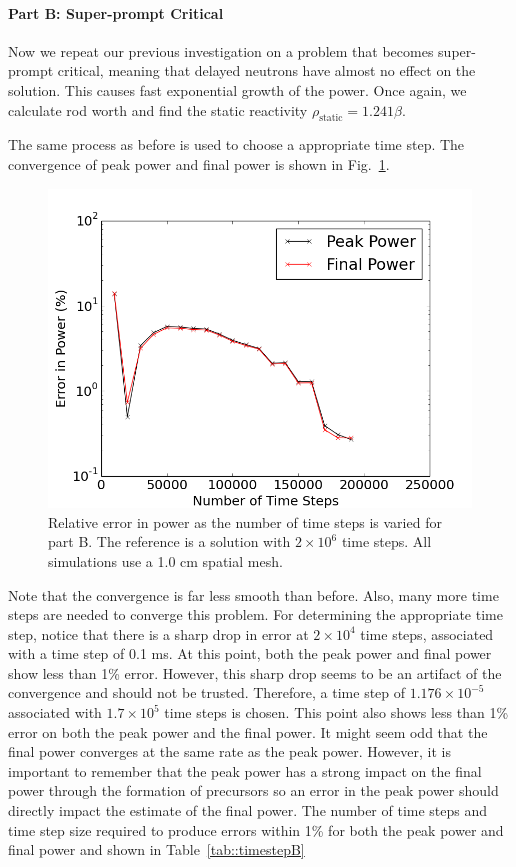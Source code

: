 \documentclass[12pt]{report}
\begin{document}
\clearpage
\paragraph{Part B: Super-prompt Critical} Now we repeat our previous investigation on a problem that becomes super-prompt critical, meaning that delayed neutrons have almost no effect on the solution. This causes fast exponential growth of the power. Once again, we calculate rod worth and find the static reactivity $\boxed{\rho_\text{static} = 1.241 \beta}$.

The same process as before is used to choose a appropriate time step. The convergence of peak power and final power is shown in Fig.~\ref{fig::partB_convergence}. 

	\begin{figure}[ht]
		\centering
		\includegraphics[width=.9\linewidth]{figs/partB_convergence.png}
		\caption{Relative error in power as the number of time steps is varied for part B. The reference is a solution with $2\times10^6$ time steps. All simulations use a 1.0 cm spatial mesh.}
		\label{fig::partB_convergence}
	\end{figure}

Note that the convergence is far less smooth than before. Also, many more time steps are needed to converge this problem. For determining the appropriate time step, notice that there is a sharp drop in error at $2 \times 10^4$ time steps, associated with a time step of 0.1 ms. At this point, both the peak power and final power show less than 1\% error. However, this sharp drop seems to be an artifact of the convergence and should not be trusted. Therefore, a time step of $1.176 \times 10^{-5}$ associated with $1.7 \times 10^5$ time steps is chosen. This point also shows less than 1\% error on both the peak power and the final power.  It might seem odd that the final power converges at the same rate as the peak power. However, it is important to remember that the peak power has a strong impact on the final power through the formation of precursors so an error in the peak power should directly impact the estimate of the final power. The number of time steps and time step size required to produce errors within 1\% for both the peak power and final power and shown in Table~\ref{tab::timestepB}
	
\end{document}
